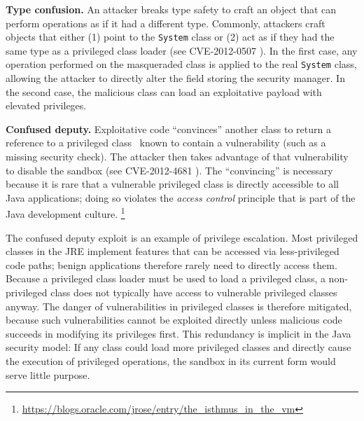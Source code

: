 \documentclass{sig-alternate}
\begin{document}
\noindent\textbf{Type confusion.} An attacker breaks type
safety to craft an object that can perform operations as if it had
a different type. Commonly, attackers craft objects that either
(1) point to the \texttt{System} class or (2) act as if they had
the same type as a privileged class loader (see CVE-2012-0507 \cite{_vulnerability_2012_0507}).
In the first case, any operation performed on the
masqueraded class is applied to the real \texttt{System} class, allowing
the attacker to directly alter the field storing the security manager. 
In the second case, the malicious class can load an exploitative
payload with elevated privileges.

\noindent\textbf{Confused deputy.} Exploitative code ``convinces'' another
class to return a reference to a privileged class~\cite{hardy_confused_1988}
known to contain a vulnerability (such as a missing security check).  The
attacker then takes advantage of that vulnerability to disable the sandbox 
(see CVE-2012-4681 \cite{_vulnerability_2012_4681}).
The ``convincing'' is necessary
because it is rare that a vulnerable privileged class is directly accessible
to all Java applications; doing so violates the \textit{access
control} principle that is part of the Java development culture.%
\footnote{\url{https://blogs.oracle.com/jrose/entry/the_isthmus_in_the_vm}%
} 

The confused deputy exploit is an example of privilege escalation.  Most
privileged classes in the JRE implement features that can be accessed via
less-privileged code paths; benign applications therefore rarely need to
directly access them. 
%
Because a privileged class loader must be used to load a privileged class, 
a non-privileged class does not typically have access to vulnerable
privileged classes anyway. The danger of vulnerabilities in privileged
classes is therefore mitigated, because such vulnerabilities cannot be exploited
directly unless malicious code succeeds in modifying its privileges first. 
This redundancy is implicit in the Java security model: If any class
could load more privileged classes and directly cause the execution
of privileged operations, the sandbox in its current form would serve
little purpose. 
\end{document}

